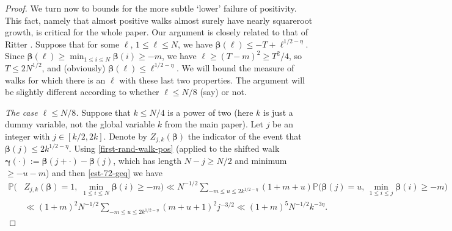 \documentclass[11pt,reqno]{amsart}
\numberwithin{equation}{section}
\theoremstyle{definition}
\theoremstyle{remark}
\newcommand{\mb}{\mathbb}
\def\boldbeta{\boldsymbol\beta}
\def\boldgamma{\boldsymbol\gamma}
\renewcommand{\le}{\leqslant}
\renewcommand{\ge}{\geqslant}
\begin{document}
\begin{proof}
We turn now to bounds for the more subtle `lower' failure of positivity. This fact, namely that almost positive walks almost surely have nearly squareroot growth, is critical for the whole paper. Our argument is closely related to that of Ritter \cite{Rit81}. Suppose that for some $\ell$, $1 \le \ell \le  N$, we have $\boldbeta(\ell) \le -T + \ell^{1/2 - \eta}$. Since $\boldbeta(\ell) \ge \min_{1 \le i \le N} \boldbeta(i) \ge -m$, we have $\ell \ge (T - m)^{2} \ge T^2/4$, so $T \le 2N^{1/2}$, and (obviously) $\boldbeta(\ell) \le \ell^{1/2 - \eta}$. We will bound the measure of walks for which there is an $\ell$ with these last two properties. The argument will be slightly different according to whether $\ell \le N/8$ (say) or not. \vspace*{8pt}

\emph{The case $\ell \le N/8$.} Suppose that $k \le N/4$ is a power of two (here $k$ is just a dummy variable, not the global variable $k$ from the main paper). Let $j$ be an integer with $j \in [k/2, 2k]$. Denote by $Z_{j,k}(\boldbeta)$ the indicator of the event that $\boldbeta(j) \le 2k^{1/2 - \eta}$.   Using \cref{first-rand-walk-pos} (applied to the shifted walk $\boldgamma(\cdot) := \boldbeta(j + \cdot) - \boldbeta(j)$, which has length $N - j \ge N/2$ and minimum $\ge -u - m$) and then \cref{est-72-geq} we have
\begin{align*} \mb{P} \big( & Z_{j,k}(\boldbeta) = 1, \; \min_{1 \le i \le N} \boldbeta(i) \ge -m\big)  \ll  N^{-1/2}\!\!\!\!\sum_{-m \le u \le 2 k^{1/2 - \eta}} (1 + m + u)\mb{P}\big(\boldbeta(j) = u, \,\min_{1 \le i \le j} \boldbeta(i) \ge -m\big)  \\ &  \ll (1 + m)^2 N^{-1/2}\sum_{-m \le u \le 2 k^{1/2 - \eta}} (m + u + 1)^2 j^{-3/2} \ll (1 + m)^5 N^{-1/2} k^{- 3\eta}. \end{align*} 


\end{proof}
\end{document}
